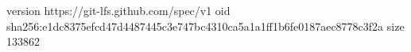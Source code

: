 version https://git-lfs.github.com/spec/v1
oid sha256:e1dc8375efcd47d4487445c3e747bc4310ca5a1a1ff1b6fe0187aec8778c3f2a
size 133862
